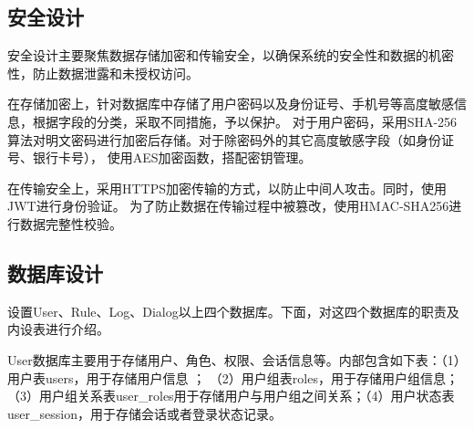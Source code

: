 \subsection{安全设计}
安全设计主要聚焦数据存储加密和传输安全，以确保系统的安全性和数据的机密性，防止数据泄露和未授权访问。

在存储加密上，针对数据库中存储了用户密码以及身份证号、手机号等高度敏感信息，根据字段的分类，采取不同措施，予以保护。
对于用户密码，采用SHA-256算法对明文密码进行加密后存储。对于除密码外的其它高度敏感字段（如身份证号、银行卡号），
使用AES加密函数，搭配密钥管理。

在传输安全上，采用HTTPS加密传输的方式，以防止中间人攻击。同时，使用JWT进行身份验证。
为了防止数据在传输过程中被篡改，使用HMAC-SHA256进行数据完整性校验。

\subsection{数据库设计}
设置User、Rule、Log、Dialog以上四个数据库。下面，对这四个数据库的职责及内设表进行介绍。

User数据库主要用于存储用户、角色、权限、会话信息等。内部包含如下表：（1）用户表users，用于存储用户信息 ；
（2）用户组表roles，用于存储用户组信息；（3）用户组关系表user\_roles用于存储用户与用户组之间关系；（4）用户状态表user\_session，用于存储会话或者登录状态记录。

